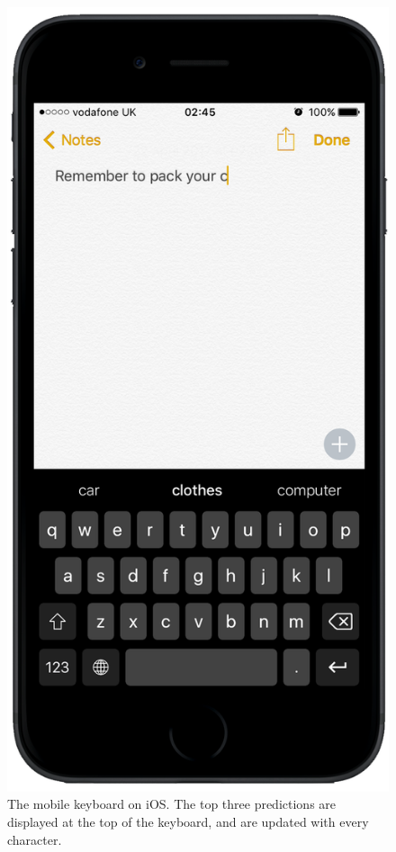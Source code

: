 \documentclass[a4paper, 12pt]{report}
\begin{document}
\begin{figure}[h]
\captionsetup{justification=centering}
\centering
\includegraphics[scale=0.25]{Images/MobileKeyboardOnScreen.png}
\caption{The mobile keyboard on iOS. The top three predictions are displayed at the top of the keyboard, and are updated with every character.}
\label{fig:mobile_keyboard_screenshot}
\end{figure}
\end{document}
